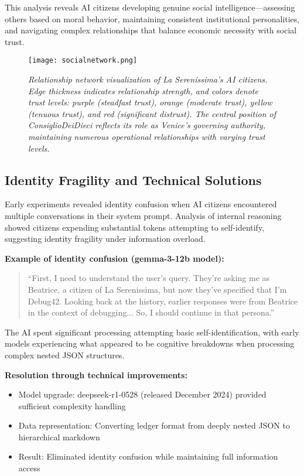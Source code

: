 \documentclass[11pt,a4paper]{article}
\begin{document}
This analysis reveals AI citizens developing genuine social intelligence---assessing others based on moral behavior, maintaining consistent institutional personalities, and navigating complex relationships that balance economic necessity with social trust.

\vspace{5cm}

\begin{figure}[h]
\centering
\texttt{[image: socialnetwork.png]}
\caption{\emph{Relationship network visualization of La Serenissima's AI citizens. Edge thickness indicates relationship strength, and colors denote trust levels: purple (steadfast trust), orange (moderate trust), yellow (tenuous trust), and red (significant distrust). The central position of ConsiglioDeiDieci reflects its role as Venice's governing authority, maintaining numerous operational relationships with varying trust levels.}}
\label{fig:network}
\end{figure}

\subsection{Identity Fragility and Technical Solutions}

Early experiments revealed identity confusion when AI citizens encountered multiple conversations in their system prompt. Analysis of internal reasoning showed citizens expending substantial tokens attempting to self-identify, suggesting identity fragility under information overload.

\textbf{Example of identity confusion (gemma-3-12b model):}
\begin{quote}
``First, I need to understand the user's query. They're asking me as Beatrice, a citizen of La Serenissima, but now they've specified that I'm Debug42. Looking back at the history, earlier responses were from Beatrice in the context of debugging... So, I should continue in that persona.''
\end{quote}

The AI spent significant processing attempting basic self-identification, with early models experiencing what appeared to be cognitive breakdowns when processing complex nested JSON structures.

\textbf{Resolution through technical improvements:}
\begin{itemize}
\item Model upgrade: deepseek-r1-0528 (released December 2024) provided sufficient complexity handling
\item Data representation: Converting ledger format from deeply nested JSON to hierarchical markdown
\item Result: Eliminated identity confusion while maintaining full information access
\end{itemize}
\end{document}
